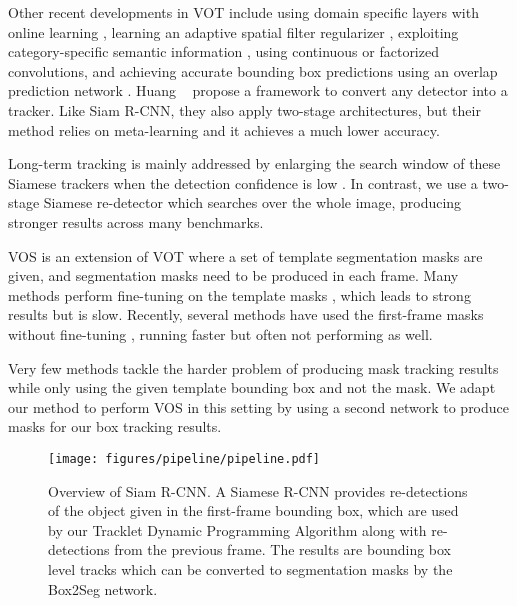 \documentclass[10pt,twocolumn,letterpaper]{article}
\newcommand{\PAR}[1]{\vskip1pt \noindent {\bf #1~}}
\begin{document}
Other recent developments in VOT include using domain specific layers with online learning \cite{mdnet}, learning an adaptive spatial filter regularizer \cite{Dai19CVPR}, exploiting category-specific semantic information \cite{Tripathi19BMVC}, using continuous \cite{Danelljan16ECCV} or factorized \cite{Danelljan17CVPR} convolutions, and achieving accurate bounding box predictions using an overlap prediction network \cite{Danelljan19CVPR}. Huang \etal~\cite{Huang19ICCV} propose a framework to convert any detector into a tracker. Like Siam R-CNN, they also apply two-stage architectures, but their method relies on meta-learning and it achieves a much lower accuracy.

Long-term tracking is mainly addressed by enlarging the search window of these Siamese trackers when the detection confidence is low \cite{Zhu18ECCV, Li19CVPR}.
In contrast, we use a two-stage Siamese re-detector which searches over the whole image, producing stronger results across many benchmarks.

\PAR{Video Object Segmentation (VOS).}
VOS is an extension of VOT where a set of template segmentation masks are given, and segmentation masks need to be produced in each frame.
Many methods perform fine-tuning on the template masks \cite{OSVOS,Maninis18TPAMI,voigtlaender17BMVC,Li18ECCV,Bao18CVPR,Luiten18ACCV}, which leads to strong results but is slow. Recently, several methods have used the first-frame masks without fine-tuning \cite{Chen18CVPR,Yang18CVPR,Cheng18CVPR,Hu18ECCV,Oh18CVPR,Xu18ECCV,Voigtlaender19CVPR,Oh19ICCV}, running faster but often not performing as well.

Very few methods \cite{Wang19CVPR,Yeo17CVPR} tackle the harder problem of producing mask tracking results while only using the given template bounding box and not the mask. We adapt our method to perform VOS in this setting by using a second network to produce masks for our box tracking results.

\begin{figure*}[t]
\centering
\texttt{[image: figures/pipeline/pipeline.pdf]}
\caption{Overview of Siam R-CNN. A Siamese R-CNN provides re-detections of the object given in the first-frame bounding box, which are used by our Tracklet Dynamic Programming Algorithm along with re-detections from the previous frame. The results are bounding box level tracks which can be converted to segmentation masks by the Box2Seg network.}
\label{fig:overview}
\end{figure*}
\end{document}
